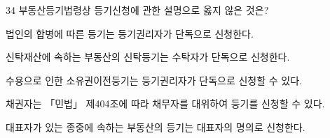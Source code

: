 \begin{question}{34}
부동산등기법령상 등기신청에 관한 설명으로 옳지 않은 것은?
\begin{choices}
  \item 법인의 합병에 따른 등기는 등기권리자가 단독으로 신청한다.
  \item 신탁재산에 속하는 부동산의 신탁등기는 수탁자가 단독으로 신청한다.
  \item 수용으로 인한 소유권이전등기는 등기권리자가 단독으로 신청할 수 있다.
  \item 채권자는 「민법」 제404조에 따라 채무자를 대위하여 등기를 신청할 수 있다.
  \item 대표자가 있는 종중에 속하는 부동산의 등기는 대표자의 명의로 신청한다.
\end{choices}
\end{question}
